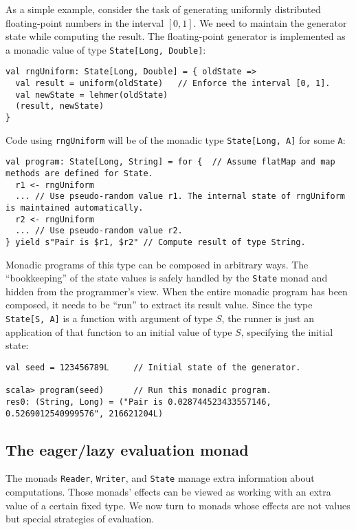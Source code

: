 As a simple example, consider the task of generating uniformly distributed
floating-point numbers in the interval $\left[0,1\right]$. We need
to maintain the generator state while computing the result. The floating-point
generator is implemented as a monadic value of type \lstinline!State[Long, Double]!:
\begin{lstlisting}
val rngUniform: State[Long, Double] = { oldState =>
  val result = uniform(oldState)   // Enforce the interval [0, 1].
  val newState = lehmer(oldState)
  (result, newState)
}
\end{lstlisting}
Code using \lstinline!rngUniform! will be of the monadic type \lstinline!State[Long, A]!
for some \lstinline!A!:
\begin{lstlisting}
val program: State[Long, String] = for {  // Assume flatMap and map methods are defined for State.
  r1 <- rngUniform
  ... // Use pseudo-random value r1. The internal state of rngUniform is maintained automatically.
  r2 <- rngUniform
  ... // Use pseudo-random value r2.
} yield s"Pair is $r1, $r2" // Compute result of type String.
\end{lstlisting}

Monadic programs of this type can be composed in arbitrary ways. The
\textsf{``}bookkeeping\textsf{''} of the state values is safely handled by the \lstinline!State!
monad and hidden from the programmer\textsf{'}s view. When the entire monadic
program has been composed, it needs to be \textsf{``}run\textsf{''} to extract its
result value. Since the type \lstinline!State[S, A]! is a function
with argument of type $S$, the runner is just
an application of that function to an initial value of type $S$,
specifying the initial state:
\begin{lstlisting}
val seed = 123456789L     // Initial state of the generator.

scala> program(seed)      // Run this monadic program.
res0: (String, Long) = ("Pair is 0.028744523433557146, 0.5269012540999576", 216621204L)
\end{lstlisting}


\subsection{The eager/lazy evaluation monad\label{subsec:The-eager-lazy-evaluation-monad}}

The monads \lstinline!Reader!, \lstinline!Writer!, and \lstinline!State!
manage extra information about computations. Those monads\textsf{'}
effects can be viewed as working with an extra value of a certain
fixed type. We now turn to monads whose effects are not values but
special strategies of evaluation. 

